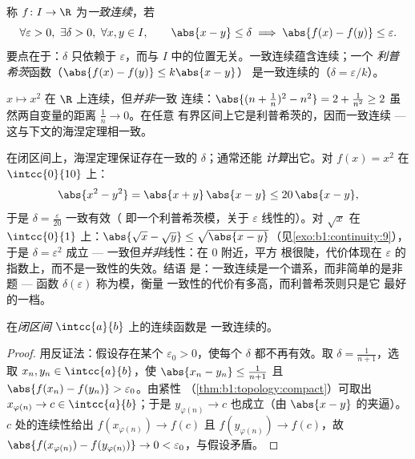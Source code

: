 \begin{definition}\label{def:b1:continuity:uniform}
称 $f \colon I \to \R$ 为\emph{一致连续}，若
\[
\forall \varepsilon > 0,\ \exists \delta > 0,\ \forall x, y \in I,
\qquad \abs{x - y} \leq \delta \implies \abs{f(x) - f(y)} \leq
\varepsilon .
\]
要点在于：$\delta$ 只依赖于 $\varepsilon$，而与
$I$ 中的位置无关。一致连续蕴含连续；一个
\emph{利普希茨}函数（$\abs{f(x) - f(y)} \leq k \abs{x - y}$）
是一致连续的（$\delta = \varepsilon/k$）。
\end{definition}

\begin{example}\label{ex:b1:continuity:notuniform}
$x \mapsto x^2$ 在 $\R$ 上连续，但\emph{并非}一致
连续：$\abs{(n + \frac 1n)^2 - n^2} = 2 + \frac{1}{n^2} \geq 2$
虽然两自变量的距离 $\frac 1n \to 0$。在任意
有界区间上它是利普希茨的，因而一致连续 --- 
这与下文的海涅定理相一致。
\end{example}

\begin{example}[一致连续模的显式计算]\label{ex:b1:continuity:moduli}
在闭区间上，海涅定理保证存在一致的 $\delta$；通常还能
\emph{计算}出它。对 $f(x) = x^2$ 在 $\intcc{0}{10}$ 上：
\[
\abs{x^2 - y^2} = \abs{x + y}\,\abs{x - y} \leq 20\,\abs{x - y},
\]
于是 $\delta = \frac{\varepsilon}{20}$ 一致有效（
即一个利普希茨模，关于 $\varepsilon$ 线性的）。对 $\sqrt x$ 在
$\intcc{0}{1}$ 上：$\abs{\sqrt x - \sqrt y} \leq \sqrt{\abs{x -
y}}$（见\cref{exo:b1:continuity:9}），于是 $\delta = \varepsilon^2$
成立 --- 一致但\emph{并非}线性：在 $0$ 附近，平方
根很陡，代价体现在
$\varepsilon$ 的指数上，而不是一致性的失效。结语
是：一致连续是一个谱系，而非简单的是非题 ---
函数 $\delta(\varepsilon)$ 称为模，衡量
一致性的代价有多高，而利普希茨则只是它
最好的一档。
\end{example}

\begin{theorem}[海涅]\label{thm:b1:continuity:heine}
在\emph{闭区间} $\intcc{a}{b}$ 上的连续函数是
一致连续的。
\end{theorem}

\begin{proof}
用反证法：假设存在某个 $\varepsilon_0 > 0$，使每个
$\delta$ 都不再有效。取 $\delta = \frac{1}{n+1}$，选取 $x_n, y_n \in
\intcc{a}{b}$，使 $\abs{x_n - y_n} \leq \frac{1}{n+1}$ 且
$\abs{f(x_n) - f(y_n)} > \varepsilon_0$。由紧性
（\cref{thm:b1:topology:compact}）可取出 $x_{\varphi(n)} \to c \in
\intcc{a}{b}$；于是 $y_{\varphi(n)} \to c$ 也成立（由 $\abs{x -
y}$ 的夹逼）。$c$ 处的连续性给出 $f(x_{\varphi(n)}) \to f(c)$ 且
$f(y_{\varphi(n)}) \to f(c)$，故 $\abs{f(x_{\varphi(n)}) -
f(y_{\varphi(n)})} \to 0 < \varepsilon_0$，与假设矛盾。
\end{proof}

